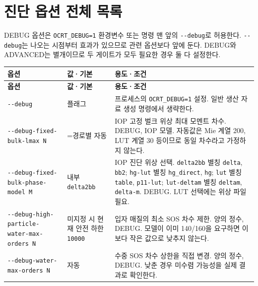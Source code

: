 \section{진단 옵션 전체 목록}
\label{sec:auto:03_options:9}
DEBUG 옵션은 \texttt{OCRT\_\allowbreak{}DEBUG=\allowbreak{}1} 환경변수 또는 명령 맨 앞의 \texttt{-\allowbreak{}-\allowbreak{}debug}로 허용한다. \texttt{-\allowbreak{}-\allowbreak{}debug}는 나오는 시점부터 효과가 있으므로 관련 옵션보다 앞에 둔다. DEBUG와 ADVANCED는 별개이므로 두 게이트가 모두 필요한 경우 둘 다 설정한다.


{\TableFont
\begin{longtable}{@{}>{\raggedright\arraybackslash}p{}>{\raggedright\arraybackslash}p{}>{\raggedright\arraybackslash}p{}@{}}
\toprule
\textbf{옵션} & \textbf{값·기본} & \textbf{용도·조건} \\
\midrule
\endfirsthead
\toprule
\textbf{옵션} & \textbf{값·기본} & \textbf{용도·조건} \\
\midrule
\endhead
\bottomrule
\endfoot
\texttt{-\allowbreak{}-\allowbreak{}debug} & 플래그 & 프로세스의 \texttt{OCRT\_\allowbreak{}DEBUG=\allowbreak{}1} 설정. 일반 생산 자료 생성 명령에서 생략한다. \\
\texttt{-\allowbreak{}-\allowbreak{}debug-\allowbreak{}fixed-\allowbreak{}bulk-\allowbreak{}lmax N} & 0=경로별 자동 & IOP 고정 벌크 위상 최대 모멘트 차수. DEBUG, IOP 모델. 자동값은 Mie 계열 200, LUT 계열 30 등이므로 동일 차수라고 가정하지 않는다. \\
\texttt{-\allowbreak{}-\allowbreak{}debug-\allowbreak{}fixed-\allowbreak{}bulk-\allowbreak{}phase-\allowbreak{}model M} & 내부 \texttt{delta2bb} & IOP 진단 위상 선택. \texttt{delta2bb} 별칭 \texttt{delta}, \texttt{bb2}; \texttt{hg-\allowbreak{}lut} 별칭 \texttt{hg\_\allowbreak{}direct}, \texttt{hg}; \texttt{lut} 별칭 \texttt{table}, \texttt{p11-\allowbreak{}lut}; \texttt{lut-\allowbreak{}deltam} 별칭 \texttt{deltam}, \texttt{delta-\allowbreak{}m}. DEBUG. LUT 선택에는 위상 파일 필요. \\
\texttt{-\allowbreak{}-\allowbreak{}debug-\allowbreak{}high-\allowbreak{}particle-\allowbreak{}water-\allowbreak{}max-\allowbreak{}orders N} & 미지정 시 현재 안전 하한 \texttt{10000} & 입자 매질의 최소 SOS 차수 제한. 양의 정수, DEBUG. 모델이 이미 140/160을 요구하면 이보다 작은 값으로 낮추지 않는다. \\
\texttt{-\allowbreak{}-\allowbreak{}debug-\allowbreak{}water-\allowbreak{}max-\allowbreak{}orders N} & 자동 & 수중 SOS 차수 상한을 직접 변경. 양의 정수, DEBUG. 낮춘 경우 미수렴 가능성을 실제 결과로 확인한다. \\

\end{longtable}}
